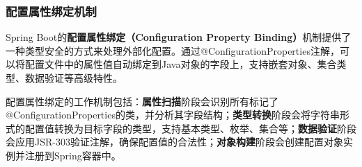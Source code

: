 \subsubsection{配置属性绑定机制}\label{ux914dux7f6eux5c5eux6027ux7ed1ux5b9aux673aux5236}

Spring Boot的\textbf{配置属性绑定（Configuration Property Binding）}机制提供了一种类型安全的方式来处理外部化配置。通过@ConfigurationProperties注解，可以将配置文件中的属性值自动绑定到Java对象的字段上，支持嵌套对象、集合类型、数据验证等高级特性。

配置属性绑定的工作机制包括：\textbf{属性扫描}阶段会识别所有标记了@ConfigurationProperties的类，并分析其字段结构；\textbf{类型转换}阶段会将字符串形式的配置值转换为目标字段的类型，支持基本类型、枚举、集合等；\textbf{数据验证}阶段会应用JSR-303验证注解，确保配置值的合法性；\textbf{对象构建}阶段会创建配置对象实例并注册到Spring容器中。

